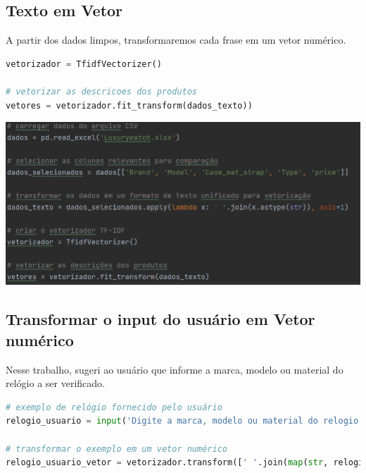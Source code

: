 \documentclass[12pt, a4paper]{article}
\begin{document}
\subsection{Texto em Vetor}
A partir dos dados limpos, transformaremos cada frase em um vetor numérico. 

\begin{tcolorbox}[colback=blue!20, colframe=gray!20]
\begin{lstlisting}[language=Python]
vetorizador = TfidfVectorizer()

# vetorizar as descricoes dos produtos
vetores = vetorizador.fit_transform(dados_texto))
\end{lstlisting}
\end{tcolorbox}

\begin{center}
    \includegraphics[width=14cm]{fig2.png}
\end{center}

\subsection{Transformar o input do usuário em Vetor numérico}
Nesse trabalho, sugeri ao usuário que informe a marca, modelo ou material do relógio a ser verificado. 
\begin{tcolorbox}[colback=blue!20, colframe=gray!20]
\begin{lstlisting}[language=Python]
# exemplo de relógio fornecido pelo usuário
relogio_usuario = input('Digite a marca, modelo ou material do relogio que você quer verificar a similaridade (separados por espaço): ').split()

# transformar o exemplo em um vetor numérico
relogio_usuario_vetor = vetorizador.transform([' '.join(map(str, relogio_usuario + [''] * (len(dados_selecionados.columns) - len(relogio_usuario))))])
\end{lstlisting}
\end{tcolorbox}
\end{document}
